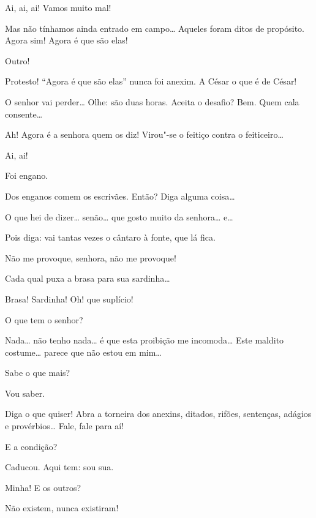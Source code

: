   Ai, ai, ai! Vamos muito mal!

  Mas não tínhamos ainda entrado em campo\ldots{} Aqueles foram
ditos de propósito. Agora sim! Agora é que são elas!

  Outro!

  Protesto! “Agora é que são elas” nunca foi anexim. A César o que
é de César!

  O senhor vai perder\ldots{} Olhe: são duas horas.  Aceita o desafio?  Bem. Quem
cala consente\ldots{}

  Ah! Agora é a senhora quem os diz! Virou"-se o feitiço contra o
feiticeiro\ldots{}

  Ai, ai!

  Foi engano.

  Dos enganos comem os escrivães.  Então?  Diga alguma
coisa\ldots{}

  O que hei de dizer\ldots{} senão\ldots{} que gosto muito da
senhora\ldots{} e\ldots{}

  Pois diga: vai tantas vezes o cântaro à fonte, que lá fica.

  Não me provoque, senhora, não me provoque!

  Cada qual puxa a brasa para sua sardinha\ldots{}

   Brasa! Sardinha! Oh! que suplício!

  O que tem o senhor?

  Nada\ldots{} não tenho nada\ldots{} é que esta proibição me
incomoda\ldots{} Este maldito costume\ldots{} parece que não estou em mim\ldots{}

  Sabe o que mais?

  Vou saber.

  Diga o que quiser! Abra a torneira dos anexins, ditados,
rifões, sentenças, adágios e provérbios\ldots{} Fale, fale para aí!

  E a condição?

  Caducou.  Aqui tem: sou sua.

   Minha!  E os outros?

  Não existem, nunca existiram!

